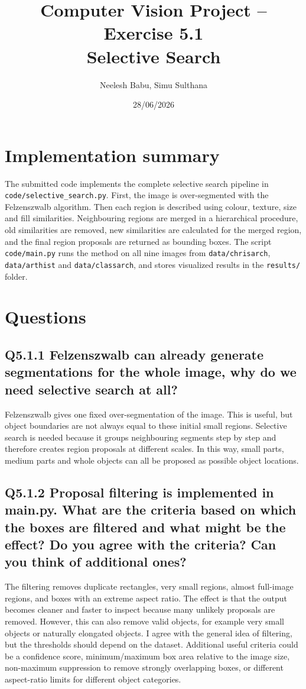 \documentclass[11pt,a4paper]{article}
\title{Computer Vision Project -- Exercise 5.1\\Selective Search}
\author{Neelesh Babu, Simu Sulthana}
\date{28/06/2026}
\begin{document}
\maketitle

\section*{Implementation summary}
The submitted code implements the complete selective search pipeline in \texttt{code/selective\_search.py}. First, the image is over-segmented with the Felzenszwalb algorithm. Then each region is described using colour, texture, size and fill similarities. Neighbouring regions are merged in a hierarchical procedure, old similarities are removed, new similarities are calculated for the merged region, and the final region proposals are returned as bounding boxes. The script \texttt{code/main.py} runs the method on all nine images from \texttt{data/chrisarch}, \texttt{data/arthist} and \texttt{data/classarch}, and stores visualized results in the \texttt{results/} folder.

\section*{Questions}

\subsection*{Q5.1.1 Felzenszwalb can already generate segmentations for the whole image, why do we need selective search at all?}
Felzenszwalb gives one fixed over-segmentation of the image. This is useful, but object boundaries are not always equal to these initial small regions. Selective search is needed because it groups neighbouring segments step by step and therefore creates region proposals at different scales. In this way, small parts, medium parts and whole objects can all be proposed as possible object locations.

\subsection*{Q5.1.2 Proposal filtering is implemented in main.py. What are the criteria based on which the boxes are filtered and what might be the effect? Do you agree with the criteria? Can you think of additional ones?}
The filtering removes duplicate rectangles, very small regions, almost full-image regions, and boxes with an extreme aspect ratio. The effect is that the output becomes cleaner and faster to inspect because many unlikely proposals are removed. However, this can also remove valid objects, for example very small objects or naturally elongated objects. I agree with the general idea of filtering, but the thresholds should depend on the dataset. Additional useful criteria could be a confidence score, minimum/maximum box area relative to the image size, non-maximum suppression to remove strongly overlapping boxes, or different aspect-ratio limits for different object categories.
\end{document}

